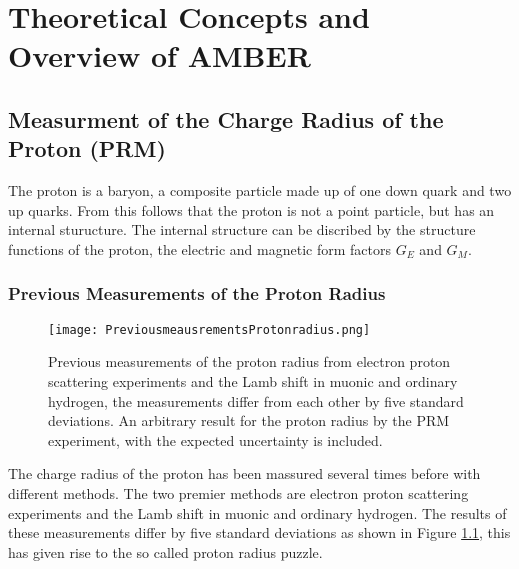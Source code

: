 \chapter{Theoretical Concepts and Overview of AMBER}\label{cha:theory}


\section{Measurment of the Charge Radius of the Proton (PRM)}\label{sec:proton_radius}
The proton is a baryon, a composite particle made up of one down quark and two up quarks.
From this follows that the proton is not a point particle, but has an internal sturucture.\autocite{Workman:2836514}
\newline
The internal structure can be discribed by the structure functions of the proton, 
the electric and magnetic form factors $G_E$ and $G_M$.\autocite{ProposalAmber}	
\subsection{Previous Measurements of the Proton Radius}
\begin{figure}[h]
	\centering
	\texttt{[image: PreviousmeausrementsProtonradius.png]}
	\caption{Previous measurements of the proton radius from electron proton scattering experiments and the Lamb shift in muonic and ordinary hydrogen,
	 the measurements differ from each other by five standard deviations. An arbitrary result for the proton radius by the PRM experiment, with the expected uncertainty is included.\autocite{ProposalAmber} }
	\label{fig:previous_proton_radius}
\end{figure}

The charge radius of the proton has been massured several times before with different methods.
The two premier methods are electron proton scattering experiments and the Lamb shift in muonic and ordinary hydrogen.
The results of these measurements differ by five standard deviations as shown in Figure \ref{fig:previous_proton_radius},
this has given rise to the so called proton radius puzzle.\autocite{ProposalAmber}

